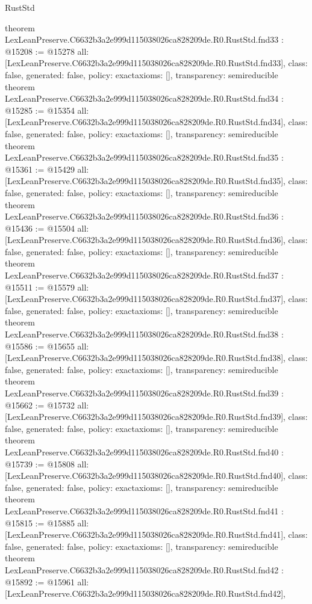 \begin{lexlean}{RustStd}
\begin{coremodule}
{}
theorem LexLeanPreserve.C6632b3a2e999d115038026ca828209de.R0.RustStd.fnd33 : @15208 := @15278 {
  all: [LexLeanPreserve.C6632b3a2e999d115038026ca828209de.R0.RustStd.fnd33],
  class: false,
  generated: false,
  policy: exact{axioms: []},
  transparency: semireducible
}
theorem LexLeanPreserve.C6632b3a2e999d115038026ca828209de.R0.RustStd.fnd34 : @15285 := @15354 {
  all: [LexLeanPreserve.C6632b3a2e999d115038026ca828209de.R0.RustStd.fnd34],
  class: false,
  generated: false,
  policy: exact{axioms: []},
  transparency: semireducible
}
theorem LexLeanPreserve.C6632b3a2e999d115038026ca828209de.R0.RustStd.fnd35 : @15361 := @15429 {
  all: [LexLeanPreserve.C6632b3a2e999d115038026ca828209de.R0.RustStd.fnd35],
  class: false,
  generated: false,
  policy: exact{axioms: []},
  transparency: semireducible
}
theorem LexLeanPreserve.C6632b3a2e999d115038026ca828209de.R0.RustStd.fnd36 : @15436 := @15504 {
  all: [LexLeanPreserve.C6632b3a2e999d115038026ca828209de.R0.RustStd.fnd36],
  class: false,
  generated: false,
  policy: exact{axioms: []},
  transparency: semireducible
}
theorem LexLeanPreserve.C6632b3a2e999d115038026ca828209de.R0.RustStd.fnd37 : @15511 := @15579 {
  all: [LexLeanPreserve.C6632b3a2e999d115038026ca828209de.R0.RustStd.fnd37],
  class: false,
  generated: false,
  policy: exact{axioms: []},
  transparency: semireducible
}
theorem LexLeanPreserve.C6632b3a2e999d115038026ca828209de.R0.RustStd.fnd38 : @15586 := @15655 {
  all: [LexLeanPreserve.C6632b3a2e999d115038026ca828209de.R0.RustStd.fnd38],
  class: false,
  generated: false,
  policy: exact{axioms: []},
  transparency: semireducible
}
theorem LexLeanPreserve.C6632b3a2e999d115038026ca828209de.R0.RustStd.fnd39 : @15662 := @15732 {
  all: [LexLeanPreserve.C6632b3a2e999d115038026ca828209de.R0.RustStd.fnd39],
  class: false,
  generated: false,
  policy: exact{axioms: []},
  transparency: semireducible
}
theorem LexLeanPreserve.C6632b3a2e999d115038026ca828209de.R0.RustStd.fnd40 : @15739 := @15808 {
  all: [LexLeanPreserve.C6632b3a2e999d115038026ca828209de.R0.RustStd.fnd40],
  class: false,
  generated: false,
  policy: exact{axioms: []},
  transparency: semireducible
}
theorem LexLeanPreserve.C6632b3a2e999d115038026ca828209de.R0.RustStd.fnd41 : @15815 := @15885 {
  all: [LexLeanPreserve.C6632b3a2e999d115038026ca828209de.R0.RustStd.fnd41],
  class: false,
  generated: false,
  policy: exact{axioms: []},
  transparency: semireducible
}
theorem LexLeanPreserve.C6632b3a2e999d115038026ca828209de.R0.RustStd.fnd42 : @15892 := @15961 {
  all: [LexLeanPreserve.C6632b3a2e999d115038026ca828209de.R0.RustStd.fnd42],
}
\end{coremodule}
\end{lexlean}
